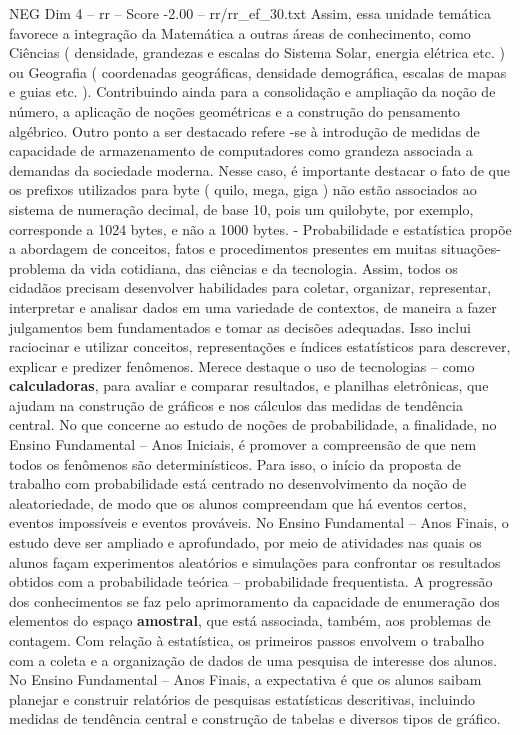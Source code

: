 \begin{textsample}{NEG Dim 4 – rr – Score -2.00 – rr/rr\_ef\_30.txt}
Assim, essa unidade temática favorece a integração da Matemática a outras áreas de conhecimento, como Ciências ( densidade, grandezas e escalas do Sistema Solar, energia elétrica etc. ) ou Geografia ( coordenadas geográficas, densidade demográfica, escalas de mapas e guias etc. ).
Contribuindo ainda para a consolidação e ampliação da noção de número, a aplicação de noções geométricas e a construção do pensamento algébrico.
Outro ponto a ser destacado refere -se à introdução de medidas de capacidade de armazenamento de computadores como grandeza associada a demandas da sociedade moderna.
Nesse caso, é importante destacar o fato de que os prefixos utilizados para byte ( quilo, mega, giga ) não estão associados ao sistema de numeração decimal, de base 10, pois um quilobyte, por exemplo, corresponde a 1024 bytes, e não a 1000 bytes. - Probabilidade e estatística propõe a abordagem de conceitos, fatos e procedimentos presentes em muitas situações-problema da vida cotidiana, das ciências e da tecnologia.
Assim, todos os cidadãos precisam desenvolver habilidades para coletar, organizar, representar, interpretar e analisar dados em uma variedade de contextos, de maneira a fazer julgamentos bem fundamentados e tomar as decisões adequadas.
Isso inclui raciocinar e utilizar conceitos, representações e índices estatísticos para descrever, explicar e predizer fenômenos.
Merece destaque o uso de tecnologias – como \textbf{calculadoras}, para avaliar e comparar resultados, e planilhas eletrônicas, que ajudam na construção de gráficos e nos cálculos das medidas de tendência central.
No que concerne ao estudo de noções de probabilidade, a finalidade, no Ensino Fundamental – Anos Iniciais, é promover a compreensão de que nem todos os fenômenos são determinísticos.
Para isso, o início da proposta de trabalho com probabilidade está centrado no desenvolvimento da noção de aleatoriedade, de modo que os alunos compreendam que há eventos certos, eventos impossíveis e eventos prováveis.
No Ensino Fundamental – Anos Finais, o estudo deve ser ampliado e aprofundado, por meio de atividades nas quais os alunos façam experimentos aleatórios e simulações para confrontar os resultados obtidos com a probabilidade teórica – probabilidade frequentista.
A progressão dos conhecimentos se faz pelo aprimoramento da capacidade de enumeração dos elementos do espaço \textbf{amostral}, que está associada, também, aos problemas de contagem.
Com relação à estatística, os primeiros passos envolvem o trabalho com a coleta e a organização de dados de uma pesquisa de interesse dos alunos.
No Ensino Fundamental – Anos Finais, a expectativa é que os alunos saibam planejar e construir relatórios de pesquisas estatísticas descritivas, incluindo medidas de tendência central e construção de tabelas e diversos tipos de gráfico.

\end{textsample}
